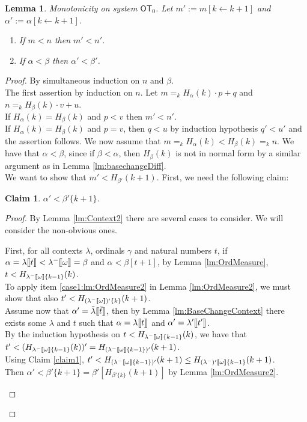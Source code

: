 \documentclass{amsart}
\theoremstyle{plain}
\theoremstyle{plain}
\newtheorem{lemma}[theorem]{Lemma}
\newtheorem{claim}[theorem]{Claim}
\def\scbrl{[\hspace{-.14em}[}
\def\scbrr{]\hspace{-.14em}]}
\def\scbr#1{\scbrl#1\scbrr}
\newcommand\OT{\mathsf{OT}}
\newcommand{\kp}{[k\leftarrow k+1]}
\newcommand{\al}{{\alpha}}
\newcommand{\be}{{\beta}}
\newcommand{\ga}{\gamma}
\newcommand{\la}{\lambda}
\newcommand{\om}{\omega}
\def\scbrl{[\hspace{-.14em}[}
\def\scbrr{]\hspace{-.14em}]}
\def\scbr#1{\scbrl#1\scbrr}
\begin{document}
\begin{lemma} \label{lm:MonBaseChange} {Monotonicity on system $\OT_0$.}
Let $m':=m\kp$ and $\al':=\al\kp$.
\begin{enumerate}
    \item If $m<n$ then $m'<n'$. 
    \item If $\al<\be$ then $\al'<\be'$.
\end{enumerate}
\end{lemma}
\begin{proof}
By simultaneous induction on $n$ and $\be$.\medskip\\
The first assertion by induction on $n$.
Let $m=_k H_\al(k)\cdot p +q$ and $n=_k H_\be(k) \cdot v + u$.\\
If $H_\al(k)=H_\be(k)$ and $p<v$ then $m'<n'$.\\
If $H_\al(k)=H_\be(k)$ and $p=v$, then $q<u$ by induction hypothesis $q'<u'$ and the assertion follows.
We now assume that $m=_k H_\al(k)< H_\be(k)=_k n$. We have that $\al<\be$, since if $\be<\al$, then $H_\be(k)$ is not in normal form by a similar argument as in Lemma \ref{lm:basechangeDiff}.
\medskip
\\
We want to show that $m'<H_{\be'}(k+1)$. First, we need the following claim:\medskip
\begin{claim} 	 $\al' < \be'\{k+1\}$.
\end{claim}
\begin{proof}
By Lemma \ref{lm:Context2} there are several cases to consider.
We will consider the non-obvious ones.
\begin{Cases}
    \item First, for all contexts $\la$, ordinals $\ga$ and natural numbers $t$, 
    if $\al=\la\scbr{t}< \la^-\scbr{\om}=\be $ and $\al<\be[t+1]$, by Lemma \ref{lm:OrdMeasure}, $t<H_{\la^-\scbr{\om}\{k-1\}}(k)$. \smallskip\\
    To apply item \ref{case1:lm:OrdMeasure2} in Lemma \ref{lm:OrdMeasure2}, we must show that also  $t'< H_{(\la^-\scbr{\om})'\{k\}}(k+1) $. \\
    Assume now  that $\al'=\tilde{\la}\scbr{\tilde{t}}$, then by  Lemma \ref{lm:BaseChangeContext} there exists some $\la$ and $t$ such that  $\al= \la\scbr{t}$ and $\al' = \la'\scbr{t'}$.
    \medskip\\
    By the induction hypothesis on $t<H_{\la^-\scbr{\om}\{k-1\}}(k)$, we have that 
    \medskip\\
    $t'<(H_{\la^-\scbr{\om}\{k-1\}}(k))' = H_{(\la^-\scbr{\om}\{k-1\})'}(k+1)$.\medskip \\
    Using Claim \ref{claim1}, 
    $t' < H_{(\la^-\scbr{\om}\{k-1\})'}(k+1) \leq H_{(\la^-)'\scbr{\om}\{k-1\}}(k+1)$.
    \medskip\\
    Then $\al' < \be'\{k+1\}= \be'[H_{\be'\{k\}}(k+1)]$ by Lemma \ref{lm:OrdMeasure2}.
    \\
    

\end{Cases}
\end{proof}
\end{proof}
\end{document}
